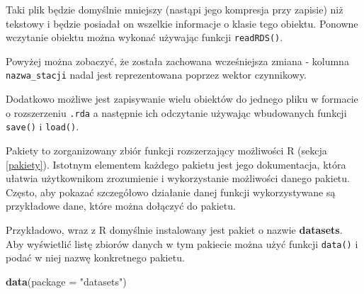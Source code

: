 \documentclass[paper=6in:9in,pagesize=pdftex,headinclude=on,footinclude=on,10pt]{scrbook}
\newenvironment{Shaded}{\begin{snugshade}}{\end{snugshade}}
\newcommand{\CommentTok}[1]{\textcolor[rgb]{0.56,0.35,0.01}{\textit{#1}}}
\newcommand{\DataTypeTok}[1]{\textcolor[rgb]{0.13,0.29,0.53}{#1}}
\newcommand{\KeywordTok}[1]{\textcolor[rgb]{0.13,0.29,0.53}{\textbf{#1}}}
\newcommand{\NormalTok}[1]{#1}
\newcommand{\StringTok}[1]{\textcolor[rgb]{0.31,0.60,0.02}{#1}}
\let\BeginKnitrBlock\begin \let\EndKnitrBlock\end
\begin{document}
Taki plik będzie domyślnie mniejszy (nastąpi jego kompresja przy zapisie) niż tekstowy i będzie posiadał on wszelkie informacje o klasie tego obiektu.
Ponowne wczytanie obiektu można wykonać używając funkcji \texttt{readRDS()}.

\begin{Shaded}
\end{Shaded}

Powyżej można zobaczyć, że została zachowana wcześniejsza zmiana - kolumna \texttt{nazwa\_stacji} nadal jest reprezentowana poprzez wektor czynnikowy.

\BeginKnitrBlock{rmdinfo}
Dodatkowo możliwe jest zapisywanie wielu obiektów do jednego pliku w formacie o rozszerzeniu \texttt{.rda} a następnie ich odczytanie używając wbudowanych funkcji \texttt{save()} i \texttt{load()}.
\EndKnitrBlock{rmdinfo}

Pakiety to zorganizowany zbiór funkcji rozszerzający możliwości R (sekcja \ref{pakiety}).
Istotnym elementem każdego pakietu jest jego dokumentacja, która ułatwia użytkownikom zrozumienie i wykorzystanie możliwości danego pakietu.
Często, aby pokazać szczegółowo działanie danej funkcji wykorzystywane są przykładowe dane, które można dołączyć do pakietu.

Przykładowo, wraz z R domyślnie instalowany jest pakiet o nazwie \textbf{datasets}.
Aby wyświetlić listę zbiorów danych w tym pakiecie można użyć funkcji \texttt{data()} i podać w niej nazwę konkretnego pakietu.

\begin{Shaded}
\begin{Highlighting}[]
\KeywordTok{data}\NormalTok{(}\DataTypeTok{package =} \StringTok{"datasets"}\NormalTok{)}
\end{Highlighting}
\end{Shaded}
\end{document}
